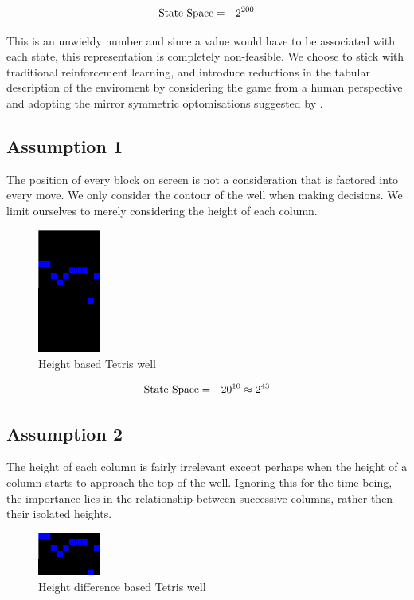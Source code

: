\documentclass{rucsthesis}
\begin{document}
\begin{eqnarray}
\centering
\textrm{State Space} & = & 2^{200} 
\end{eqnarray}

This is an unwieldy number and since a value would have to be associated with each state, this representation is completely non-feasible. We choose to stick with traditional reinforcement learning, and introduce reductions in the tabular description of the enviroment by considering the game from a human perspective and adopting the mirror symmetric optomisations suggested by \cite{yaeltetris}. 

\subsection*{Assumption 1}

The position of every block on screen is not a consideration that is factored into every move. We only consider the contour of the well when making decisions. We limit ourselves to merely considering the height of each column.

\begin{figure}[h]
\centering
\includegraphics[width=0.8in]{heightwell.png}
\caption{Height based Tetris well}
\label{fig:heightwell}
\end{figure}

\begin{eqnarray}
\centering
\textrm{State Space} & = & 20^{10} \approx 2^{43}
\end{eqnarray}

\subsection*{Assumption 2}

The height of each column is fairly irrelevant except perhaps when the height of a column starts to approach the top of the well. Ignoring this for the time being, the importance lies in the relationship between successive columns, rather then their isolated heights.

\begin{figure}[h]
\centering
\includegraphics[width=0.8in]{diffheightwell.png}
\caption{Height difference based Tetris well}
\label{fig:diffheightwell}
\end{figure}
\end{document}
